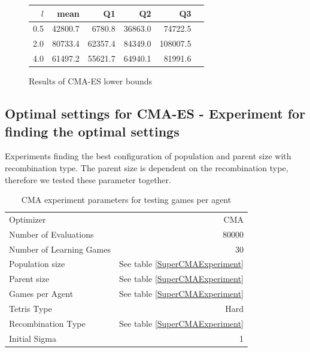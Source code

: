 \begin{figure}[H]
\centering
\begin{tabular}{r | r r r r r}
$l$ & mean & Q1 & Q2 & Q3\\
\hline
0.5 & 42800.7 & 6780.8  & 36863.0 & 74722.5\\
2.0 & 80733.4 & 62357.4 & 84349.0 & 108007.5\\
4.0 & 61497.2 & 55621.7 & 64940.1 & 81991.6\\
\end{tabular}
\caption{Results of CMA-ES lower bounds \label{appendixCMALowerBoundConfigTest}}
\end{figure}





\clearpage

\subsection{Optimal settings for CMA-ES - Experiment for finding the optimal settings \label{appendixCMAPopulationParent}}
Experiments finding the best configuration of population and parent size with recombination type. The parent size is dependent on the recombination type, therefore we tested these parameter together.
\begin{table}[h]
\centering
\begin{tabular}{l r}
Optimizer & CMA\\
Number of Evaluations & 80000\\
Number of Learning Games &30\\
Population size& See table \ref{SuperCMAExperiment}\\
Parent size & See table \ref{SuperCMAExperiment}\\
Games per Agent & See table \ref{SuperCMAExperiment}\\
Tetris Type & Hard\\
\hline
Recombination Type & See table \ref{SuperCMAExperiment}\\
Initial Sigma & 1
\end{tabular}
\caption{CMA experiment parameters for testing games per agent}
\end{table}

